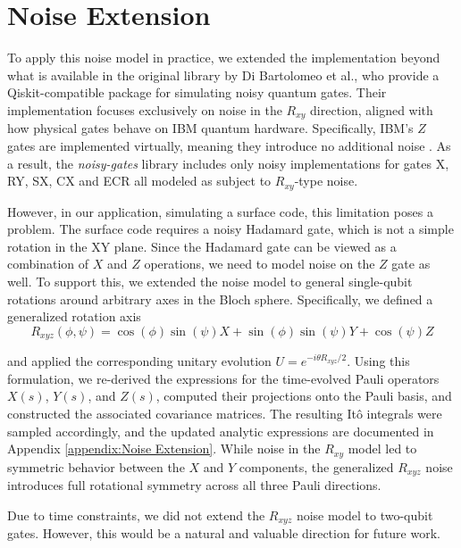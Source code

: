 \documentclass[9pt,a4paper,twocolumn,twoside]{tau-class/tau}
\begin{document}
\section{Noise Extension}
To apply this noise model in practice, we extended the implementation beyond what is available in the original library by Di Bartolomeo et al., who provide a Qiskit-compatible package for simulating noisy quantum gates\cite{dibartolomeo2023noisy,quantum_gates_repo}. Their implementation focuses exclusively on noise in the $R_{xy}$ direction, aligned with how physical gates behave on IBM quantum hardware. Specifically, IBM’s $Z$ gates are implemented virtually, meaning they introduce no additional noise \cite{mckay2017efficient}. As a result, the \textit{noisy-gates} library includes only noisy implementations for gates X, RY, SX, CX and ECR all modeled as subject to $R_{xy}$-type noise\cite{quantum_gates_repo}.

However, in our application, simulating a surface code, this limitation poses a problem. The surface code requires a noisy Hadamard gate, which is not a simple rotation in the XY plane. Since the Hadamard gate can be viewed as a combination of $X$ and $Z$ operations, we need to model noise on the $Z$ gate as well. To support this, we extended the noise model to general single-qubit rotations around arbitrary axes in the Bloch sphere. Specifically, we defined a generalized rotation axis 
\begin{equation}
    R_{xyz}(\phi, \psi) = \cos(\phi)\sin(\psi) X + \sin(\phi)\sin(\psi) Y +  \cos(\psi)Z
\end{equation}

and applied the corresponding unitary evolution $U = e^{-i\theta R_{xyz}/2}$. Using this formulation, we re-derived the expressions for the time-evolved Pauli operators $X(s)$, $Y(s)$, and $Z(s)$, computed their projections onto the Pauli basis, and constructed the associated covariance matrices. The resulting Itô integrals were sampled accordingly, and the updated analytic expressions are documented in Appendix \ref{appendix:Noise Extension}. While noise in the $R_{xy}$ model led to symmetric behavior between the $X$ and $Y$ components, the generalized $R_{xyz}$ noise introduces full rotational symmetry across all three Pauli directions.

Due to time constraints, we did not extend the $R_{xyz}$ noise model to two-qubit gates. However, this would be a natural and valuable direction for future work.
\end{document}
